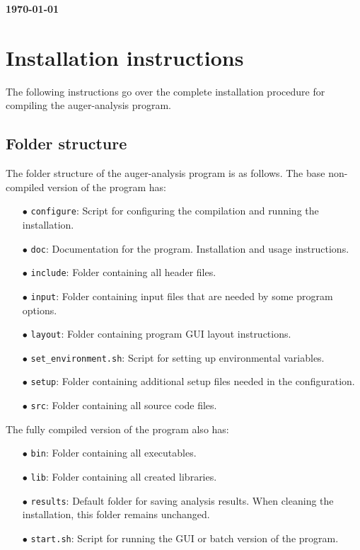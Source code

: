 \documentclass[12pt,a4paper]{report}
\begin{document}

\begin{flushright}
{\large\textbf{\today}}
\end{flushright}

\let\clearpage\relax
\chapter{Installation instructions}
{\noindent}The following instructions go over the complete installation procedure for compiling the auger-analysis program.

\section{Folder structure}
{\noindent}The folder structure of the auger-analysis program is as follows. The base non-compiled version of the program has:
\begin{itemize}
\item[$\bullet$] \texttt{configure}: Script for configuring the compilation and running the installation.
\item[$\bullet$] \texttt{doc}: Documentation for the program. Installation and usage instructions.
\item[$\bullet$] \texttt{include}: Folder containing all header files.
\item[$\bullet$] \texttt{input}: Folder containing input files that are needed by some program options.
\item[$\bullet$] \texttt{layout}: Folder containing program GUI layout instructions.
\item[$\bullet$] \texttt{set\_environment.sh}: Script for setting up environmental variables.
\item[$\bullet$] \texttt{setup}: Folder containing additional setup files needed in the configuration.
\item[$\bullet$] \texttt{src}: Folder containing all source code files.
\end{itemize}
The fully compiled version of the program also has:
\begin{itemize}
\item[$\bullet$] \texttt{bin}: Folder containing all executables.
\item[$\bullet$] \texttt{lib}: Folder containing all created libraries.
\item[$\bullet$] \texttt{results}: Default folder for saving analysis results. When cleaning the installation, this folder remains unchanged.
\item[$\bullet$] \texttt{start.sh}: Script for running the GUI or batch version of the program.
\end{itemize}
\end{document}
